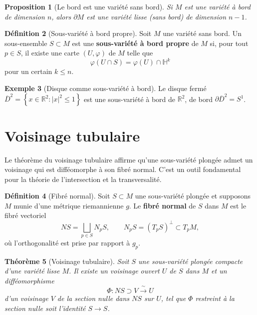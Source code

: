 \documentclass[12pt,a4paper,openany]{book}
\theoremstyle{definition}
\newtheorem{definition}{Définition}[chapter]
\newtheorem{exemple}[definition]{Exemple}
\theoremstyle{plain}
\newtheorem{theoreme}[definition]{Théorème}
\newtheorem{proposition}[definition]{Proposition}
\theoremstyle{remark}
\newcommand{\R}{\mathbb{R}}
\newcommand{\abs}[1]{\left|#1\right|}
\newcommand{\set}[1]{\left\{#1\right\}}
\begin{document}
\begin{proposition}[Le bord est une variété sans bord]\label{prop:bord-sans-bord}
Si $M$ est une variété à bord de dimension $n$, alors $\partial M$ est une variété
lisse (sans bord) de dimension $n - 1$.
\end{proposition}

\begin{definition}[Sous-variété à bord propre]\label{def:sous-variete-bord}
Soit $M$ une variété sans bord. Un sous-ensemble $S \subset M$ est une
\textbf{sous-variété à bord propre} de $M$ si, pour tout $p \in S$, il existe une
carte $(U, \varphi)$ de $M$ telle que
\[
  \varphi(U \cap S) = \varphi(U) \cap \mathbb{H}^k
\]
pour un certain $k \leqslant n$.
\end{definition}

\begin{exemple}[Disque comme sous-variété à bord]\label{ex:disque-bord}
Le disque fermé $\overline{D}^2 = \set{x \in \R^2 : \abs{x}^2 \leqslant 1}$ est une
sous-variété à bord de $\R^2$, de bord $\partial\overline{D}^2 = S^1$.
\end{exemple}

\section{Voisinage tubulaire}\label{sec:voisinage-tubulaire}

Le théorème du voisinage tubulaire affirme qu'une sous-variété plongée admet
un voisinage qui est difféomorphe à son fibré normal. C'est un outil fondamental
pour la théorie de l'intersection et la transversalité.

\begin{definition}[Fibré normal]\label{def:fibre-normal}
Soit $S \subset M$ une sous-variété plongée et supposons $M$ munie d'une métrique
riemannienne $g$. Le \textbf{fibré normal} de $S$ dans $M$ est le fibré vectoriel
\[
  NS = \bigsqcup_{p \in S} N_pS, \qquad N_pS = (T_pS)^\perp \subset T_pM,
\]
où l'orthogonalité est prise par rapport à $g_p$.
\end{definition}

\begin{theoreme}[Voisinage tubulaire]\label{thm:voisinage-tubulaire}
Soit $S$ une sous-variété plongée compacte d'une variété lisse $M$.
Il existe un voisinage ouvert $U$ de $S$ dans $M$ et un difféomorphisme
\[
  \Phi : NS \supset V \xrightarrow{\;\sim\;} U
\]
d'un voisinage $V$ de la section nulle dans $NS$ sur $U$, tel que $\Phi$ restreint
à la section nulle soit l'identité $S \to S$.
\end{theoreme}
\end{document}

